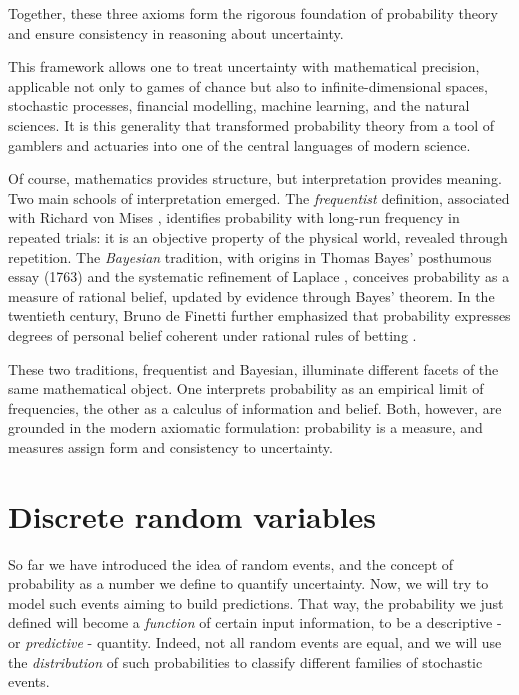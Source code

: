 \documentclass{book}
\begin{document}
Together, these three axioms form the rigorous foundation of probability theory and ensure consistency in reasoning about uncertainty.

\medskip

This framework allows one to treat uncertainty with mathematical precision, applicable not only to games of chance but also to infinite-dimensional spaces, stochastic processes, financial modelling, machine learning, and the natural sciences. It is this generality that transformed probability theory from a tool of gamblers and actuaries into one of the central languages of modern science.

\medskip

Of course, mathematics provides structure, but interpretation provides meaning. Two main schools of interpretation emerged. The \emph{frequentist} definition, associated with Richard von Mises \cite{vonmises1928}, identifies probability with long-run frequency in repeated trials: it is an objective property of the physical world, revealed through repetition. The \emph{Bayesian} tradition, with origins in Thomas Bayes’ posthumous essay (1763) \cite{bayes1763} and the systematic refinement of Laplace \cite{laplace1812}, conceives probability as a measure of rational belief, updated by evidence through Bayes’ theorem. In the twentieth century, Bruno de Finetti further emphasized that probability expresses degrees of personal belief coherent under rational rules of betting \cite{definetti1974}. 

\medskip

These two traditions, frequentist and Bayesian, illuminate different facets of the same mathematical object. One interprets probability as an empirical limit of frequencies, the other as a calculus of information and belief. Both, however, are grounded in the modern axiomatic formulation: probability is a measure, and measures assign form and consistency to uncertainty. 

\section{Discrete random variables}

So far we have introduced the idea of random events, and the concept of probability as a number we define to quantify uncertainty. Now, we will try to model such events aiming to build predictions. That way, the probability we just defined will become a \textit{function} of certain input information, to be a descriptive - or \textit{predictive} - quantity. Indeed, not all random events are equal, and we will use the \textit{distribution} of such probabilities to classify different families of stochastic events.
\end{document}

